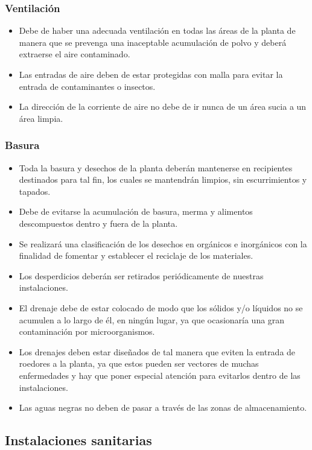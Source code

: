 \subsubsection{Ventilación}
\begin{itemize}
	\item Debe de haber una adecuada ventilación en todas las áreas de la planta de manera que se prevenga una inaceptable acumulación de polvo y deberá extraerse el aire contaminado.
	\item Las entradas de aire deben de estar protegidas con malla para evitar la entrada de contaminantes o insectos.
	\item La dirección de la corriente de aire no debe de ir nunca de un área sucia a un área limpia.
\end{itemize}

\subsubsection{Basura}
\begin{itemize}
	\item Toda la basura y desechos de la planta deberán mantenerse en recipientes destinados para tal fin, los cuales se mantendrán limpios, sin escurrimientos y tapados.
	\item Debe de evitarse la acumulación de basura, merma y alimentos descompuestos dentro y fuera de la planta.
	\item Se realizará una clasificación de los desechos en orgánicos e inorgánicos con la finalidad de fomentar y establecer el reciclaje de los materiales.
	\item Los desperdicios deberán ser retirados periódicamente de nuestras instalaciones.
	\item El drenaje debe de estar colocado de modo que los sólidos y/o líquidos no se acumulen a lo largo de él, en ningún lugar, ya que ocasionaría una gran contaminación por microorganismos.
	\item Los drenajes deben estar diseñados de tal manera que eviten la entrada de roedores a la planta, ya que estos pueden ser vectores de muchas enfermedades y hay que poner especial atención para evitarlos dentro de las instalaciones.
	\item Las aguas negras no deben de pasar a través de las zonas de almacenamiento.
\end{itemize}

\subsection{Instalaciones sanitarias}

